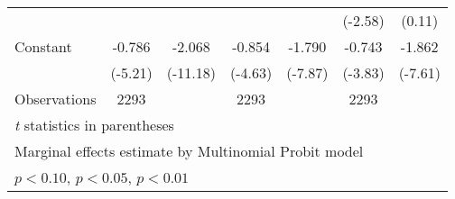 {\begin{longtable}{l*{6}{c}}
                    &                     &                     &                     &                     &     (-2.58)         &      (0.11)         \\
\addlinespace
Constant            &      -0.786\sym{***}&      -2.068\sym{***}&      -0.854\sym{***}&      -1.790\sym{***}&      -0.743\sym{***}&      -1.862\sym{***}\\
                    &     (-5.21)         &    (-11.18)         &     (-4.63)         &     (-7.87)         &     (-3.83)         &     (-7.61)         \\
\midrule
Observations        &        2293         &                     &        2293         &                     &        2293         &                     \\
\bottomrule
\multicolumn{7}{l}{\footnotesize \textit{t} statistics in parentheses}\\
\multicolumn{7}{l}{\footnotesize  Marginal effects estimate by Multinomial Probit model}\\
\multicolumn{7}{l}{\footnotesize \sym{*} \(p<0.10\), \sym{**} \(p<0.05\), \sym{***} \(p<0.01\)}\\
\end{longtable}
}
